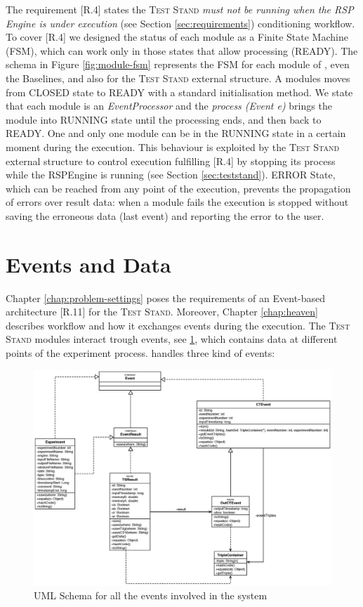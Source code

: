 The requirement [R.4] states the \textsc{Test Stand} \textit{must not be running when the RSP Engine is under execution} (see Section \ref{sec:requirements}) conditioning \name workflow. To cover [R.4] we designed the status of each module  as a Finite State Machine (FSM), which can work only in those states that allow processing (READY). The schema in Figure \ref{fig:module-fsm} represents the FSM for each module of \name, even the Baselines, and also for the \textsc{Test Stand} external structure. 
A modules moves from CLOSED state to READY with a standard initialisation method. We state that each module is an \textit{EventProcessor} and the \textit{ process (Event e)} brings the module into RUNNING state until the processing ends, and then back to READY. One and only one module can be in the RUNNING state in a certain moment during the execution. This behaviour is exploited by the \textsc{Test Stand} external structure to control execution fulfilling [R.4] by stopping its process while the RSPEngine is running (see Section \ref{sec:teststand}). ERROR State, which can be reached from any point of the execution, prevents the propagation of errors over result data: when a module fails the execution is stopped without saving the erroneous data (last event) and reporting the error to the user.

\section{Events and Data}\label{sec:data-impl}

Chapter \ref{chap:problem-settings} poses the requirements of an Event-based architecture [R.11] for the \textsc{Test Stand}. Moreover, Chapter \ref{chap:heaven} describes \name workflow and how it exchanges events during the execution. The \textsc{Test Stand} modules interact trough events, see \ref{fig:uml_events},  which contains data at different points of the experiment process. \name handles three kind of events:

\begin{figure}[tbh]
  \centering
	\includegraphics[width=\linewidth]{images/uml_events}
	\caption{UML Schema for all the events involved in the system} 
  	\label{fig:uml_events}
\end{figure}

